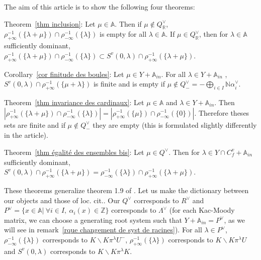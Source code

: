 \documentclass[12pt]{article}
\theoremstyle{plain}
\theoremstyle{definition}
\newcommand{\R}{\mathbb{R}}
\newcommand{\A}{\mathbb{A}}
\newcommand{\N}{\mathbb{N}}
\newcommand{\Z}{\mathbb{Z}}
\begin{document}
\vspace{3mm}
 The aim of this article is to show the following four theorems: 
\vspace{3mm}

Theorem~\ref{thm inclusion}:
Let $\mu\in \A$. Then if $\mu\notin Q_{\R}^\vee$, $\rho_{+\infty}^{-1}(\{\lambda+\mu\})\cap \rho_{-\infty}^{-1}(\{\lambda\})$ is empty for all $\lambda\in \A$. If $\mu\in Q^\vee_{\R}$, then for $\lambda\in \A$ sufficiently dominant, $\rho_{+\infty}^{-1}(\{\lambda+\mu\})\cap \rho_{-\infty}^{-1}(\{\lambda\})\subset S^v(0,\lambda)\cap \rho_{+\infty}^{-1}(\{\lambda+\mu\}) $. 

\vspace{3mm}
Corollary~\ref{cor finitude des boules}:
 Let $\mu\in Y+\A_{in}$. For all $\lambda\in Y+\A_{in}$ , $S^v(0,\lambda)\cap \rho_{+\infty}^{-1}(\{\mu+\lambda\})$ is finite and is empty if $\mu\notin Q^\vee_-=-\bigoplus _{i\in I}\N\alpha_i^\vee$.

\vspace{3mm}
Theorem~\ref{thm invariance des cardinaux}: 
Let $\mu\in \A$ and $\lambda\in Y+\A_{in}$. Then $|\rho_{+\infty}^{-1}(\{\lambda+\mu\})\cap\rho_{-\infty}^{-1}(\{\lambda\})|=|\rho_{+\infty}^{-1}(\{\mu\})\cap\rho_{-\infty}^{-1}(\{0\})|$. Therefore theses sets are finite and if $\mu\notin Q^\vee_-$ they are empty (this is formulated slightly differently in the article).

\vspace{3mm}
Theorem~\ref{thm égalité des ensembles bis}:
 Let $\mu\in Q^\vee$. Then for $\lambda\in Y\cap C^v_f+\A_{in}$ sufficiently dominant, $S^v(0,\lambda)\cap \rho_{+\infty}^{-1}(\{\lambda+\mu\})=\rho_{-\infty}^{-1}(\{\lambda\})\cap\rho_{+\infty}^{-1}(\{\lambda+\mu\})$.
\vspace{3mm}

These theorems generalize theorem 1.9 of \cite{braverman2014affine}. Let us make the dictionary between our objects and those of loc. cit.. Our $Q^\vee$ corresponds to $R^\vee$ and $P^\vee=\{x\in \A|\ \forall i\in I,\ \alpha_i(x)\in\Z\}$ corresponds to $\Lambda^\vee$ (for each Kac-Moody matrix, we can choose a generating root system  such that $Y+\A_{in}=P^\vee$, as we will see in remark~\ref{rque changement de syst de racines}). For all $\lambda\in P^\vee$, $\rho_{-\infty}^{-1}(\{\lambda\})$ corresponds to $K\backslash K \pi^\lambda U^{-}$, $\rho_{+\infty}^{-1}(\{\lambda\})$ corresponds to $K\backslash K\pi^\lambda U$ and $S^v(0,\lambda)$ corresponds to  $K\backslash K\pi^\lambda K$. 
\end{document}
